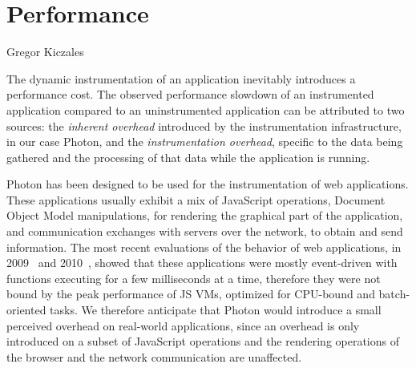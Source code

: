 \chapter{Performance}
\label{chap:Performance}



{Gregor Kiczales~\cite{Kiczales92towardsa}}

The dynamic instrumentation of an application inevitably introduces a performance
cost. The observed performance slowdown of an instrumented application
compared to an uninstrumented application can be attributed to two sources: the
\textit{inherent overhead} introduced by the instrumentation infrastructure, in
our case Photon, and the \textit{instrumentation overhead}, specific to the
data being gathered and the processing of that data while the application is
running. 

Photon has been designed to be used for the instrumentation of web
applications. These applications usually exhibit a mix of JavaScript
operations, Document Object Model manipulations, for rendering the
graphical part of the application, and communication exchanges with servers
over the network, to obtain and send information.  The most recent evaluations
of the behavior of web applications, in 2009~\cite{jsmeter} and
2010~\cite{behavior_js}, showed that these applications were mostly
event-driven with functions executing for a few milliseconds at a time,
therefore they were not bound by the peak performance of JS VMs, optimized for
CPU-bound and batch-oriented tasks. We therefore anticipate that Photon would
introduce a small perceived overhead on real-world applications, since an
overhead is only introduced on a subset of JavaScript operations and the
rendering operations of the browser and the network communication are
unaffected.


